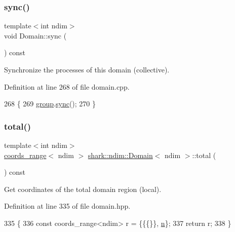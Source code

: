 \subsubsection{\texorpdfstring{sync()}{sync()}}
{\footnotesize\ttfamily template$<$int ndim$>$ \\
void Domain\+::sync (\begin{DoxyParamCaption}{ }\end{DoxyParamCaption}) const}

Synchronize the processes of this domain (collective). 

Definition at line 268 of file domain.\+cpp.


\begin{DoxyCode}
268                               \{
269     \hyperlink{classshark_1_1ndim_1_1_domain_a2bbf100371762ce405efd218bc1e3d0f}{group}.\hyperlink{classshark_1_1_group_a73a616469f03e775f8203e86690fbe7e}{sync}();
270 \}
\end{DoxyCode}
\hypertarget{classshark_1_1ndim_1_1_domain_ae4357c99519b3efbaf2544828629de87}{}\label{classshark_1_1ndim_1_1_domain_ae4357c99519b3efbaf2544828629de87} 
\subsubsection{\texorpdfstring{total()}{total()}}
{\footnotesize\ttfamily template$<$int ndim$>$ \\
\hyperlink{structshark_1_1ndim_1_1coords__range}{coords\+\_\+range}$<$ ndim $>$ \hyperlink{classshark_1_1ndim_1_1_domain}{shark\+::ndim\+::\+Domain}$<$ ndim $>$\+::total (\begin{DoxyParamCaption}{ }\end{DoxyParamCaption}) const\hspace{0.3cm}{\ttfamily [inline]}}

Get coordinates of the total domain region (local). 

Definition at line 335 of file domain.\+hpp.


\begin{DoxyCode}
335                                                             \{
336             \textcolor{keyword}{const} coords\_range<ndim> r = \{\{\{\}\}, \hyperlink{classshark_1_1ndim_1_1_domain_ab942ffcf99c5ee0f2589c8b9104abcfd}{n}\};
337             \textcolor{keywordflow}{return} r;
338         \}
\end{DoxyCode}


